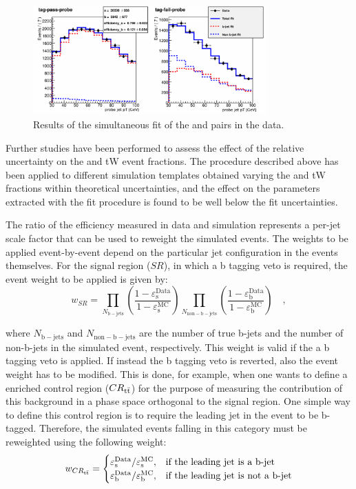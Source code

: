 \begin{figure}[htb]
\centering
\includegraphics[width=0.8\textwidth]{images/data_ptprobe-v2.pdf}
\caption{Results of the simultaneous fit of the \tpp and \tfp pairs in the data.\label{fig:data_tp}}
\end{figure}

Further studies have been performed to assess the effect of the relative uncertainty on the \ttbar and tW event fractions. The procedure described above has been applied to different simulation templates obtained varying the \ttbar and tW fractions within theoretical uncertainties, and the effect on the parameters extracted with the fit procedure is found to be well below the fit uncertainties.

The ratio of the efficiency measured in data and simulation represents a per-jet scale factor that can be used to reweight the simulated events. The weights to be applied event-by-event depend on the particular jet configuration in the events themselves. For the signal region ($SR$), in which a b tagging veto is required, the event weight to be applied is given by:
\begin{equation}
w_{SR} = \prod_{N_\mathrm{b-jets}} \left( \frac{1-\varepsilon_\mathrm{s}^\mathrm{Data}}{1-\varepsilon_\mathrm{s}^\mathrm{MC}} \right) \prod_{N_\mathrm{non-b-jets}} \left( \frac{1-\varepsilon_\mathrm{b}^\mathrm{Data}}{1-\varepsilon_\mathrm{b}^\mathrm{MC}} \right) \quad ,
\end{equation}

\noindent where $N_\mathrm{b-jets}$ and $N_\mathrm{non-b-jets}$ are the number of true b-jets and the number of non-b-jets in the simulated event, respectively. This weight is valid if the a b tagging veto is applied. If instead the b tagging veto is reverted, also the event weight has to be modified. This is done, for example, when one wants to define a \ttbar enriched control region ($CR_{\mathrm{t}\bar{\mathrm{t}}}$) for the purpose of measuring the contribution of this background in a phase space orthogonal to the signal region. One simple way to define this control region is to require the leading jet in the event to be b-tagged. Therefore, the simulated events falling in this category must be reweighted using the following weight:
\begin{equation}
w_{CR_{\mathrm{t}\bar{\mathrm{t}}}} = 
\begin{cases}
\varepsilon_\mathrm{s}^\mathrm{Data}/\varepsilon_\mathrm{s}^\mathrm{MC},& \text{if the leading jet is a b-jet} \\
\varepsilon_\mathrm{b}^\mathrm{Data}/\varepsilon_\mathrm{b}^\mathrm{MC},& \text{if the leading jet is not a b-jet} 
\end{cases}
\end{equation}




